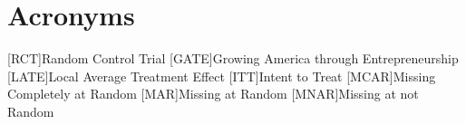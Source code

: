 
\section*{Acronyms}
\begin{acronym}
	[RCT]{Random Control Trial}
	[GATE]{Growing America through Entrepreneurship}
      	[LATE]{Local Average Treatment Effect}
	[ITT]{Intent to Treat}
	[MCAR]{Missing Completely at Random}
	[MAR]{Missing at Random}
	[MNAR]{Missing at not Random}
\end{acronym}
